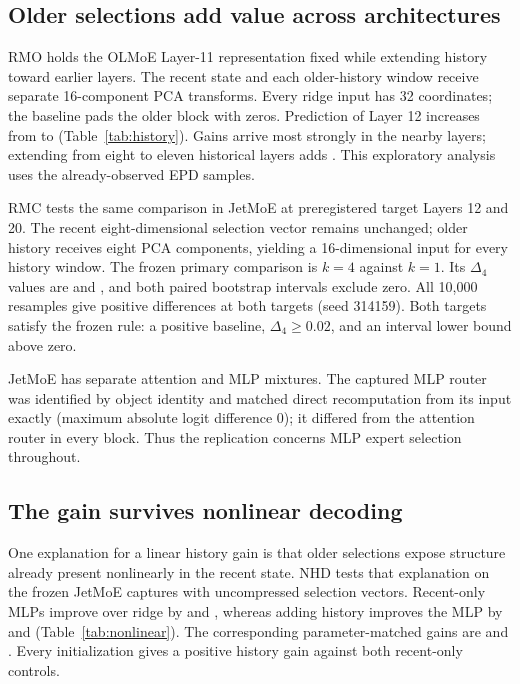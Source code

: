 \documentclass[10pt,letterpaper,twocolumn]{yalearxiv}
\begin{document}


\subsection{Older selections add value across architectures}
RMO holds the OLMoE Layer-11 representation fixed while extending history toward earlier layers. The recent state and each older-history window receive separate 16-component PCA transforms. Every ridge input has 32 coordinates; the baseline pads the older block with zeros. Prediction of Layer 12 increases from  to  (Table~\ref{tab:history}). Gains arrive most strongly in the nearby layers; extending from eight to eleven historical layers adds . This exploratory analysis uses the already-observed EPD samples.

RMC tests the same comparison in JetMoE at preregistered target Layers 12 and 20. The recent eight-dimensional selection vector remains unchanged; older history receives eight PCA components, yielding a 16-dimensional input for every history window. The frozen primary comparison is $k=4$ against $k=1$. Its $\Delta_4$ values are  and , and both paired bootstrap intervals exclude zero. All 10,000 resamples give positive differences at both targets (seed 314159). Both targets satisfy the frozen rule: a positive baseline, $\Delta_4\geq0.02$, and an interval lower bound above zero.

JetMoE has separate attention and MLP mixtures. The captured MLP router was identified by object identity and matched direct recomputation from its input exactly (maximum absolute logit difference $0$); it differed from the attention router in every block. Thus the replication concerns MLP expert selection throughout.

\subsection{The gain survives nonlinear decoding}
One explanation for a linear history gain is that older selections expose structure already present nonlinearly in the recent state. NHD tests that explanation on the frozen JetMoE captures with uncompressed selection vectors. Recent-only MLPs improve over ridge by  and , whereas adding history improves the MLP by  and  (Table~\ref{tab:nonlinear}). The corresponding parameter-matched gains are  and . Every initialization gives a positive history gain against both recent-only controls.
\end{document}
